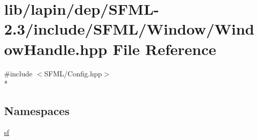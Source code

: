 \hypertarget{lapin_2dep_2_s_f_m_l-2_83_2include_2_s_f_m_l_2_window_2_window_handle_8hpp}{\section{lib/lapin/dep/\-S\-F\-M\-L-\/2.3/include/\-S\-F\-M\-L/\-Window/\-Window\-Handle.hpp File Reference}
\label{lapin_2dep_2_s_f_m_l-2_83_2include_2_s_f_m_l_2_window_2_window_handle_8hpp}
}
{\ttfamily \#include $<$S\-F\-M\-L/\-Config.\-hpp$>$}\\*
\subsection*{Namespaces}
\begin{DoxyCompactItemize}
\item 
\hyperlink{namespacesf}{sf}
\end{DoxyCompactItemize}
